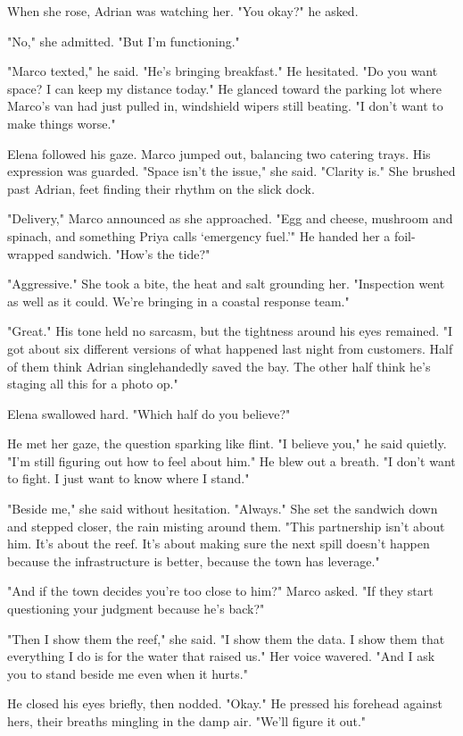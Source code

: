 When she rose, Adrian was watching her. "You okay?" he asked.

"No," she admitted. "But I'm functioning."

"Marco texted," he said. "He's bringing breakfast." He hesitated. "Do you want space? I can keep my distance today." He glanced toward the parking lot where Marco's van had just pulled in, windshield wipers still beating. "I don't want to make things worse."

Elena followed his gaze. Marco jumped out, balancing two catering trays. His expression was guarded. "Space isn't the issue," she said. "Clarity is." She brushed past Adrian, feet finding their rhythm on the slick dock.

"Delivery," Marco announced as she approached. "Egg and cheese, mushroom and spinach, and something Priya calls `emergency fuel.'" He handed her a foil-wrapped sandwich. "How's the tide?"

"Aggressive." She took a bite, the heat and salt grounding her. "Inspection went as well as it could. We're bringing in a coastal response team."

"Great." His tone held no sarcasm, but the tightness around his eyes remained. "I got about six different versions of what happened last night from customers. Half of them think Adrian singlehandedly saved the bay. The other half think he's staging all this for a photo op."

Elena swallowed hard. "Which half do you believe?"

He met her gaze, the question sparking like flint. "I believe you," he said quietly. "I'm still figuring out how to feel about him." He blew out a breath. "I don't want to fight. I just want to know where I stand."

"Beside me," she said without hesitation. "Always." She set the sandwich down and stepped closer, the rain misting around them. "This partnership isn't about him. It's about the reef. It's about making sure the next spill doesn't happen because the infrastructure is better, because the town has leverage."

"And if the town decides you're too close to him?" Marco asked. "If they start questioning your judgment because he's back?"

"Then I show them the reef," she said. "I show them the data. I show them that everything I do is for the water that raised us." Her voice wavered. "And I ask you to stand beside me even when it hurts."

He closed his eyes briefly, then nodded. "Okay." He pressed his forehead against hers, their breaths mingling in the damp air. "We'll figure it out."

